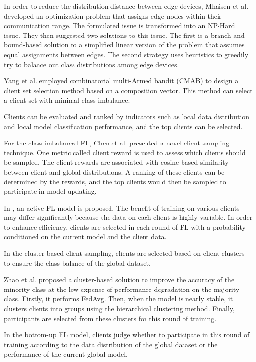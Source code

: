 \documentclass[10pt,journal,compsoc]{IEEEtran}
\begin{document}
	In order to reduce the distribution distance between edge devices, Mhaisen et al. \cite{mhaisen2021optimal} developed an optimization problem that assigns edge nodes within their communication range. The formulated issue is transformed into an NP-Hard issue. They then suggested two solutions to this issue. The first is a branch and bound-based solution to a simplified linear version of the problem that assumes equal assignments between edges. The second strategy uses heuristics to greedily try to balance out class distributions among edge devices. 
	
	Yang et al. \cite{yang2021federated} employed combinatorial multi-Armed bandit (CMAB)\cite{chen2013combinatorial} to design a client set selection method based on a composition vector. This method can select a client set with minimal class imbalance. 
	
	Clients can be evaluated and ranked by indicators such as local data distribution and local model classification performance, and the top clients can be selected.
	
	For the class imbalanced FL, Chen et al. \cite{chen2021novel} presented a novel client sampling technique. One metric called client reward is used to assess which clients should be sampled. The client rewards are associated with cosine-based similarity between client and global distributions. A ranking of these clients can be determined by the rewards, and the top clients would then be sampled to participate in model updating.  
	
	In \cite{goetz2019active}, an active FL model is proposed. The benefit of training on various clients may differ significantly because the data on each client is highly variable. In order to enhance efficiency, clients are selected in each round of FL with a probability conditioned on the current model and the client data.
	
	In the cluster-based client sampling, clients are selected based on client clusters to ensure the class balance of the global dataset.
	
	Zhao et al. \cite{zhao2020cluster} proposed a cluster-based solution to improve the accuracy of the minority class at the low expense of performance degradation on the majority class. Firstly, it performs FedAvg. Then, when the model is nearly stable, it clusters clients into groups using the hierarchical clustering method. Finally, participants are selected from these clusters for this round of training.
	
	In the bottom-up FL model, clients judge whether to participate in this round of training according to the data distribution of the global dataset or the performance of the current global model.
	
\end{document}
